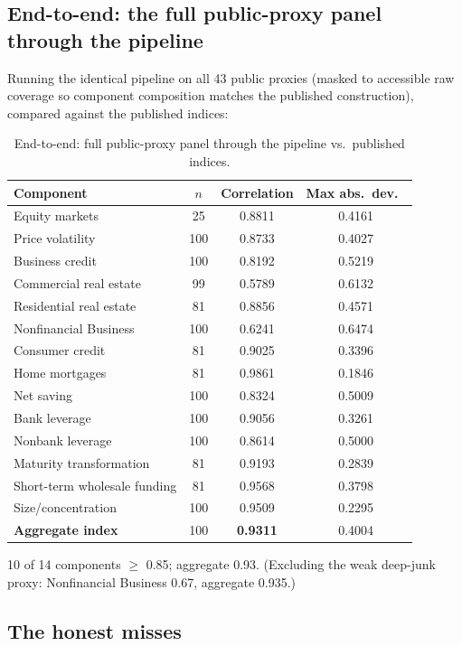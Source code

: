 \documentclass[11pt]{article}
\begin{document}
\subsection{End-to-end: the full public-proxy panel through the pipeline}

Running the identical pipeline on all 43 public proxies (masked to
accessible raw coverage so component composition matches the published
construction), compared against the published indices:

\begin{table}[h]
\centering
\caption{End-to-end: full public-proxy panel through the pipeline vs.\
published indices.}
\label{tab:endtoend}
\begin{tabular}{lccc}
\toprule
Component & $n$ & Correlation & Max abs.\ dev.\ \\
\midrule
Equity markets & 25 & 0.8811 & 0.4161 \\
Price volatility & 100 & 0.8733 & 0.4027 \\
Business credit & 100 & 0.8192 & 0.5219 \\
Commercial real estate & 99 & 0.5789 & 0.6132 \\
Residential real estate & 81 & 0.8856 & 0.4571 \\
Nonfinancial Business & 100 & 0.6241 & 0.6474 \\
Consumer credit & 81 & 0.9025 & 0.3396 \\
Home mortgages & 81 & 0.9861 & 0.1846 \\
Net saving & 100 & 0.8324 & 0.5009 \\
Bank leverage & 100 & 0.9056 & 0.3261 \\
Nonbank leverage & 100 & 0.8614 & 0.5000 \\
Maturity transformation & 81 & 0.9193 & 0.2839 \\
Short-term wholesale funding & 81 & 0.9568 & 0.3798 \\
Size/concentration & 100 & 0.9509 & 0.2295 \\
\midrule
\textbf{Aggregate index} & 100 & \textbf{0.9311} & 0.4004 \\
\bottomrule
\end{tabular}
\end{table}

10 of 14 components $\ge$ 0.85; aggregate 0.93.  (Excluding the weak
deep-junk proxy: Nonfinancial Business 0.67, aggregate 0.935.)

\subsection{The honest misses}
\label{sec:misses}
\end{document}
